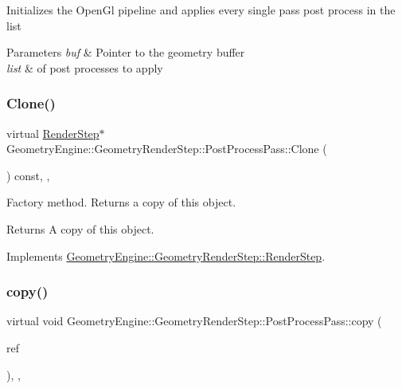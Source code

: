 Initializes the Open\+Gl pipeline and applies every single pass post process in the list 
\begin{DoxyParams}{Parameters}
{\em buf} & Pointer to the geometry buffer \\
\hline
{\em list} & of post processes to apply \\
\hline
\end{DoxyParams}
\mbox{\label{class_geometry_engine_1_1_geometry_render_step_1_1_post_process_pass_afcf20dc0a20cf1e0fb730c7b56071c26}} 
\subsubsection{\texorpdfstring{Clone()}{Clone()}}
{\footnotesize\ttfamily virtual \mbox{\hyperlink{class_geometry_engine_1_1_geometry_render_step_1_1_render_step}{Render\+Step}}$\ast$ Geometry\+Engine\+::\+Geometry\+Render\+Step\+::\+Post\+Process\+Pass\+::\+Clone (\begin{DoxyParamCaption}{ }\end{DoxyParamCaption}) const\hspace{0.3cm}{\ttfamily [inline]}, {\ttfamily [override]}, {\ttfamily [virtual]}}

Factory method. Returns a copy of this object. \begin{DoxyReturn}{Returns}
A copy of this object. 
\end{DoxyReturn}


Implements \mbox{\hyperlink{class_geometry_engine_1_1_geometry_render_step_1_1_render_step_afe33ea9d82c5be11f55af7d39691d44b}{Geometry\+Engine\+::\+Geometry\+Render\+Step\+::\+Render\+Step}}.

\mbox{\label{class_geometry_engine_1_1_geometry_render_step_1_1_post_process_pass_a5279399395c18ac4ef35fa3028aa4950}} 
\subsubsection{\texorpdfstring{copy()}{copy()}}
{\footnotesize\ttfamily virtual void Geometry\+Engine\+::\+Geometry\+Render\+Step\+::\+Post\+Process\+Pass\+::copy (\begin{DoxyParamCaption}\item[{const \mbox{\hyperlink{class_geometry_engine_1_1_geometry_render_step_1_1_post_process_pass}{Post\+Process\+Pass}} \&}]{ref }\end{DoxyParamCaption})\hspace{0.3cm}{\ttfamily [inline]}, {\ttfamily [protected]}, {\ttfamily [virtual]}}

